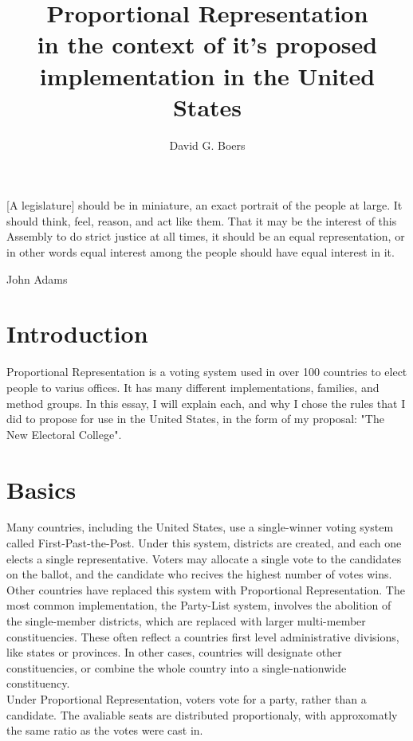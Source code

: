 \documentclass{article}
\title{
    Proportional Representation\\
    \large in the context of it's proposed implementation in the United States}
\author{David G. Boers}
\begin{document}
    \maketitle

    \epigraph{[A legislature] should be in miniature, an exact portrait of the people at large. It should think, feel, reason, and act like them. That it may be the interest of this Assembly to do strict justice at all times, it should be an equal representation, or in other words equal interest among the people should have equal interest in it.}{John Adams}

    \section{Introduction}

    Proportional Representation is a voting system used in over 100 countries to elect people to varius offices. It has many different implementations, families, and method groups. In this essay, I will explain each, and why I chose the rules that I did to propose for use in the United States, in the form of my proposal: "The New Electoral College".

    \section{Basics}

    Many countries, including the United States, use a single-winner voting system called First-Past-the-Post. Under this system, districts are created, and each one elects a single representative. Voters may allocate a single vote to the candidates on the ballot, and the candidate who recives the highest number of votes wins.\\

    Other countries have replaced this system with Proportional Representation. The most common implementation, the Party-List system, involves the abolition of the single-member districts, which are replaced with larger multi-member constituencies. These often reflect a countries first level administrative divisions, like states or provinces. In other cases, countries will designate other constituencies, or combine the whole country into a single-nationwide constituency.\\

    Under Proportional Representation, voters vote for a party, rather than a candidate. The avaliable seats are distributed proportionaly, with approxomatly the same ratio as the votes were cast in.\\
\end{document}
